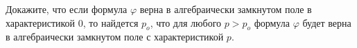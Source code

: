 Докажите, что если формула $\varphi$ верна в алгебраически замкнутом поле в характеристикой $0$, то
найдется $p_o$, что для любого $p > p_o$ формула $\varphi$ будет верна в алгебраически замкнутом поле с
характеристикой $p$.
